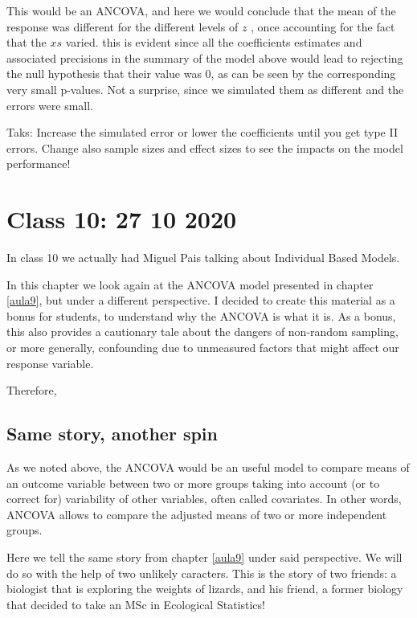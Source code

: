 \documentclass[
]{book}
\begin{document}
This would be an ANCOVA, and here we would conclude that the mean of the response was different for the different levels of \(z\) , once accounting for the fact that the \(xs\) varied. this is evident since all the coefficients estimates and associated precisions in the summary of the model above would lead to rejecting the null hypothesis that their value was 0, as can be seen by the corresponding very small p-values. Not a surprise, since we simulated them as different and the errors were small.

Taks: Increase the simulated error or lower the coefficients until you get type II errors. Change also sample sizes and effect sizes to see the impacts on the model performance!

\hypertarget{aula10}{%
\chapter{Class 10: 27 10 2020}\label{aula10}}

In class 10 we actually had Miguel Pais talking about Individual Based Models.

In this chapter we look again at the ANCOVA model presented in chapter \ref{aula9}, but under a different perspective. I decided to create this material as a bonus for students, to understand why the ANCOVA is what it is. As a bonus, this also provides a cautionary tale about the dangers of non-random sampling, or more generally, confounding due to unmeasured factors that might affect our response variable.

Therefore,

\hypertarget{same-story-another-spin}{%
\section{Same story, another spin}\label{same-story-another-spin}}

As we noted above, the ANCOVA would be an useful model to compare means of an outcome variable between two or more groups taking into account (or to correct for) variability of other variables, often called covariates. In other words, ANCOVA allows to compare the adjusted means of two or more independent groups.

Here we tell the same story from chapter \ref{aula9} under said perspective. We will do so with the help of two unlikely caracters. This is the story of two friends: a biologist that is exploring the weights of lizards, and his friend, a former biology that decided to take an MSc in Ecological Statistics!
\end{document}
